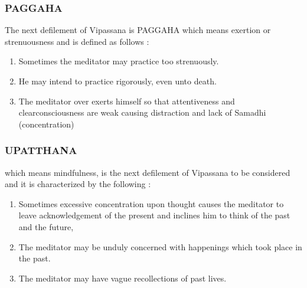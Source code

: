 \documentclass[a5paper,10pt,english]{book}
\begin{document}
\subsubsection{PAGGAHA}
\label{\detokenize{progress:paggaha}}
\sphinxAtStartPar
The next defilement of Vipassana is PAGGAHA which means exertion or strenuousness and is defined as follows  :\sphinxhyphen{}
\begin{enumerate}
%
\item {} 
\sphinxAtStartPar
Sometimes the meditator may practice too strenuously.

\item {} 
\sphinxAtStartPar
He may intend to practice rigorously, even unto death.

\item {} 
\sphinxAtStartPar
The meditator over exerts himself so that attentiveness and clear\sphinxhyphen{}consciousness are weak causing distraction and lack of Samadhi (concentration)

\end{enumerate}


\subsubsection{UPATTHANA}
\label{\detokenize{progress:upatthana}}
\sphinxAtStartPar
which means mindfulness, is the next defilement of Vipassana to be considered and it is characterized by the following :\sphinxhyphen{}
\begin{enumerate}
%
\item {} 
\sphinxAtStartPar
Sometimes excessive concentration upon thought causes the meditator to leave acknowledgement of the present and inclines him to think of the past and the future,

\item {} 
\sphinxAtStartPar
The meditator may be unduly concerned with happenings which took place in the past.

\item {} 
\sphinxAtStartPar
The meditator may have vague recollections of past lives.

\end{enumerate}
\end{document}
